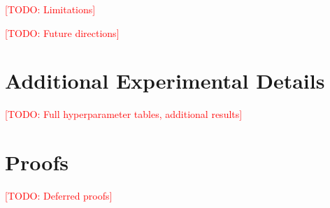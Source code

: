 \documentclass{article}
\newcommand{\todo}[1]{\textcolor{red}{[TODO: #1]}}
\begin{document}
\todo{Limitations}

\todo{Future directions}





\appendix
\section{Additional Experimental Details}
\label{app:details}
\todo{Full hyperparameter tables, additional results}

\section{Proofs}
\label{app:proofs}
\todo{Deferred proofs}
\end{document}
